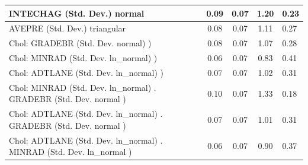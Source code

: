 \begin{table}
\begin{center}
\begin{tabular}{|l|l|c|c|c|l|}
			\hline
			INTECHAG (Std. Dev.) normal &  & 0.09 & 0.07 & 1.20 & 0.23 \\
			\hline
			AVEPRE (Std. Dev.) triangular &  & 0.08 & 0.07 & 1.11 & 0.27 \\
			\hline
			 Chol: GRADEBR (Std. Dev. normal) ) &  & 0.08 & 0.07 & 1.07 & 0.28 \\
			\hline
			 Chol: MINRAD (Std. Dev. ln_normal) ) &  & 0.06 & 0.07 & 0.83 & 0.41 \\
			\hline
			 Chol: ADTLANE (Std. Dev. ln_normal) ) &  & 0.07 & 0.07 & 1.02 & 0.31 \\
			\hline
			 Chol: MINRAD (Std. Dev. ln_normal) . GRADEBR (Std. Dev.   normal ) &  & 0.10 & 0.07 & 1.33 & 0.18 \\
			\hline
			 Chol: ADTLANE (Std. Dev. ln_normal) . GRADEBR (Std. Dev.   normal ) &  & 0.07 & 0.07 & 1.01 & 0.31 \\
			\hline
			 Chol: ADTLANE (Std. Dev. ln_normal) . MINRAD (Std. Dev.   ln_normal ) &  & 0.06 & 0.07 & 0.90 & 0.37 \\
			\hline
		\end{tabular}
	\end{center}
\end{table}